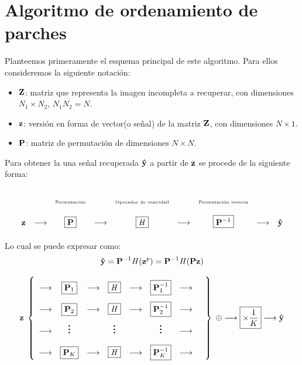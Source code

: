 \chapter{Algoritmo de ordenamiento de parches}\label{chapter:PRA} %

Planteemos primeramente el esquema principal de este algoritmo. Para ellos consideremos la siguiente notaci\'on:

\begin{itemize}
\item $\Z$: matriz que representa la imagen incompleta a recuperar, con dimensiones $N_1 \times N_2$, $N_1N_2 = N$.
\item $\z$: versión en forma de vector(o señal) de la matriz $\Z$, con dimensiones $N \times 1$.
\item $\P$: matriz de permutaci\'on de dimensiones $N \times N$.
\end{itemize}

Para obtener la una señal recuperada $\yhat$ a partir de $\z$ se procede de la siguiente forma:

\begin{equation}
	\begin{array}[t]{ccccccccc}
	& & \mbox{\tiny{Permutaci\'on}} & & \mbox{\tiny{Operador de suavidad}} & & \mbox{\tiny{Permutaci\'on inversa}} & &\\
	\z & \longrightarrow & \boxed{\P} & \longrightarrow & \boxed{\H} & \longrightarrow & \boxed{\P^{-1}} & \longrightarrow & \yhat \\
	\end{array}
\end{equation}

\qquad 

Lo cual se puede expresar como:
\begin{equation}
\yhat = \P^{-1}\H(\z^p) = \P^{-1}\H(\P\z)
\end{equation}


\begin{equation}
	\z\;\left\{
	\def\arraystretch{2.2}
	\begin{array}{ccccccccc}
		\longrightarrow & \boxed{\P_1} & \longrightarrow & \boxed{\H} & \longrightarrow & \boxed{\P_1^{-1}} & \longrightarrow \\
		\longrightarrow & \boxed{\P_2} & \longrightarrow & \boxed{\H} & \longrightarrow & \boxed{\P_2^{-1}} & \longrightarrow \\
		\longrightarrow & \huge\vdots &  & \huge\vdots &  & \huge\vdots & \longrightarrow & \\
		\longrightarrow & \boxed{\P_K} & \longrightarrow & \boxed{\H} & \longrightarrow & \boxed{\P_K^{-1}} & \longrightarrow
	\end{array}
	\right\}\;\oplus\longrightarrow\boxed{\times\frac{1}{K}}\longrightarrow\yhat
\end{equation}

